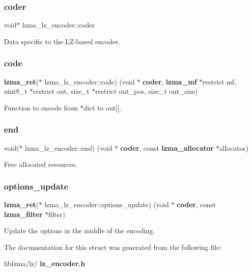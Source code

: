 \subsubsection{coder}
{\footnotesize\ttfamily void$\ast$ lzma\+\_\+lz\+\_\+encoder\+::coder}



Data specific to the L\+Z-\/based encoder. 

\mbox{\label{structlzma__lz__encoder_a8d2e84b9a57757a6edbb53fc9201de72}} 
\subsubsection{code}
{\footnotesize\ttfamily \textbf{ lzma\+\_\+ret}($\ast$ lzma\+\_\+lz\+\_\+encoder\+::code) (void $\ast$\textbf{ coder}, \textbf{ lzma\+\_\+mf} $\ast$restrict mf, uint8\+\_\+t $\ast$restrict out, size\+\_\+t $\ast$restrict out\+\_\+pos, size\+\_\+t out\+\_\+size)}



Function to encode from $\ast$dict to out[]. 

\mbox{\label{structlzma__lz__encoder_a8e2d9f291993304232baf193d759ae10}} 
\subsubsection{end}
{\footnotesize\ttfamily void($\ast$ lzma\+\_\+lz\+\_\+encoder\+::end) (void $\ast$\textbf{ coder}, const \textbf{ lzma\+\_\+allocator} $\ast$allocator)}



Free allocated resources. 

\mbox{\label{structlzma__lz__encoder_a91a5ad3e500c80920481a1a72db3c231}} 
\subsubsection{options\+\_\+update}
{\footnotesize\ttfamily \textbf{ lzma\+\_\+ret}($\ast$ lzma\+\_\+lz\+\_\+encoder\+::options\+\_\+update) (void $\ast$\textbf{ coder}, const \textbf{ lzma\+\_\+filter} $\ast$filter)}



Update the options in the middle of the encoding. 



The documentation for this struct was generated from the following file\+:\begin{DoxyCompactItemize}
\item 
liblzma/lz/\textbf{ lz\+\_\+encoder.\+h}\end{DoxyCompactItemize}
